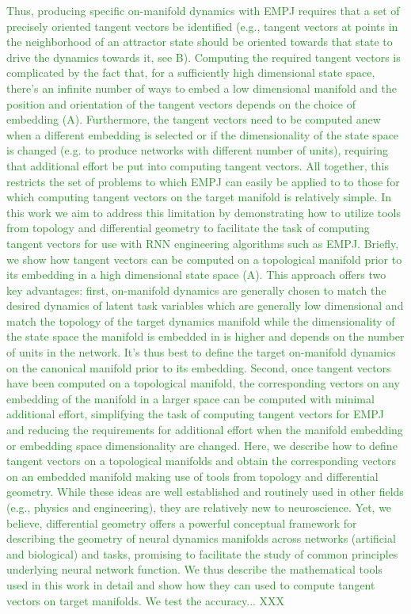 \textcolor{ForestGreen}{Thus, producing specific on-manifold dynamics with EMPJ requires that a set of precisely
oriented tangent vectors be identified (e.g., tangent vectors at points in the neighborhood of an attractor state should
be oriented towards that state to drive the dynamics towards it, see B). Computing the required tangent
vectors is complicated by the fact that, for a sufficiently high dimensional state space, there's an infinite number of
ways to embed a low dimensional manifold and the position and orientation of the tangent vectors depends on the choice
of embedding (A). Furthermore, the tangent vectors need to be computed anew when a different embedding
is selected or if the dimensionality of the state space is changed (e.g. to produce networks with different number of
units), requiring that additional effort be put into computing tangent vectors. All together, this restricts the set of
problems to which EMPJ can easily be applied to to those for which computing tangent vectors on the target manifold is
relatively simple. 
In this work we aim to address this limitation by demonstrating how to utilize tools from topology and differential
geometry to facilitate the task of computing tangent vectors for use with RNN engineering algorithms such as EMPJ.
Briefly, we show how tangent vectors can be computed on a topological manifold prior to its embedding in a high
dimensional state space (A). This approach offers two key advantages: first, on-manifold dynamics are generally
chosen to match the desired dynamics of latent task variables   which are generally low dimensional and match the topology of the target dynamics manifold 
while the dimensionality of the state space the manifold is embedded in is higher and depends on the number of units in the network.
It's thus best to define the target on-manifold dynamics on the canonical manifold prior to its embedding.
Second, once tangent vectors have been computed on a topological manifold, the corresponding vectors on any embedding of the manifold in a
larger space can be computed with minimal additional effort, simplifying the task of computing tangent vectors for EMPJ and
reducing the requirements for additional effort when the manifold embedding or embedding space dimensionality are changed.
Here, we describe how to define tangent vectors on a topological manifolds and obtain the corresponding vectors on an embedded
manifold making use of tools from topology and differential geometry. While these ideas are well established and 
routinely used in other fields (e.g., physics and engineering), they are relatively new to neuroscience. 
Yet, we believe, differential geometry offers a powerful conceptual framework for describing the geometry of neural dynamics manifolds
across networks (artificial and biological) and tasks, promising to facilitate the study of common principles underlying 
neural network function. We thus describe the mathematical tools used in this work in detail and show how they can used to compute
tangent vectors on target manifolds. We test the accuracy... XXX
}


